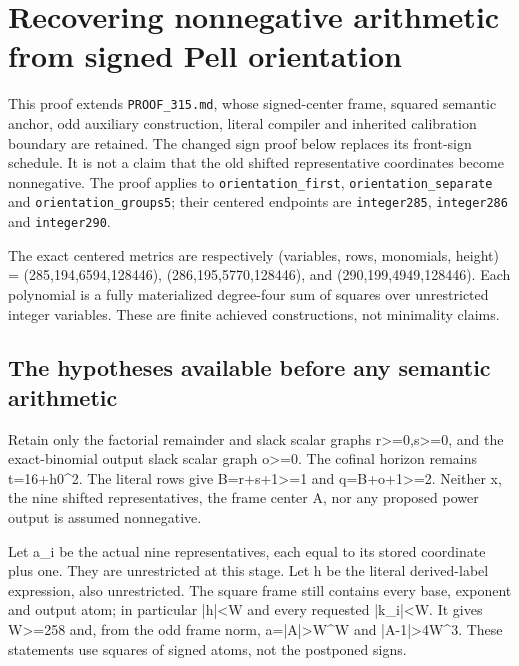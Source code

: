 \section{Recovering nonnegative arithmetic from signed Pell orientation}



This proof extends \texttt{PROOF\_\allowbreak{}315.md}, whose signed-center frame, squared semantic anchor, odd auxiliary construction, literal compiler and inherited calibration boundary are retained. The changed sign proof below replaces its front-sign schedule. It is not a claim that the old shifted representative coordinates become nonnegative. The proof applies to \texttt{orientation\_\allowbreak{}first}, \texttt{orientation\_\allowbreak{}separate} and \texttt{orientation\_\allowbreak{}groups5}; their centered endpoints are \texttt{integer285}, \texttt{integer286} and \texttt{integer290}.



The exact centered metrics are respectively (variables, rows, monomials, height) =\allowbreak{} (285,194,6594,128446), (286,195,5770,128446), and (290,199,4949,128446). Each polynomial is a fully materialized degree-four sum of squares over unrestricted integer variables. These are finite achieved constructions, not minimality claims.



\subsection{The hypotheses available before any semantic arithmetic}



Retain only the factorial remainder and slack scalar graphs r\textgreater{}\allowbreak{}=\allowbreak{}0,s\textgreater{}\allowbreak{}=\allowbreak{}0, and the exact-binomial output slack scalar graph o\textgreater{}\allowbreak{}=\allowbreak{}0. The cofinal horizon remains t=\allowbreak{}16+\allowbreak{}h0\textasciicircum{}\allowbreak{}2. The literal rows give B=\allowbreak{}r+\allowbreak{}s+\allowbreak{}1\textgreater{}\allowbreak{}=\allowbreak{}1 and q=\allowbreak{}B+\allowbreak{}o+\allowbreak{}1\textgreater{}\allowbreak{}=\allowbreak{}2. Neither x, the nine shifted representatives, the frame center A, nor any proposed power output is assumed nonnegative.



Let a\_\allowbreak{}i be the actual nine representatives, each equal to its stored coordinate plus one. They are unrestricted at this stage. Let h be the literal derived-label expression, also unrestricted. The square frame still contains every base, exponent and output atom; in particular |h|\textless{}\allowbreak{}W and every requested |k\_\allowbreak{}i|\textless{}\allowbreak{}W. It gives W\textgreater{}\allowbreak{}=\allowbreak{}258 and, from the odd frame norm, a=\allowbreak{}|A|\textgreater{}\allowbreak{}W\textasciicircum{}\allowbreak{}W and |A-1|\textgreater{}\allowbreak{}4W\textasciicircum{}\allowbreak{}3. These statements use squares of signed atoms, not the postponed signs.



